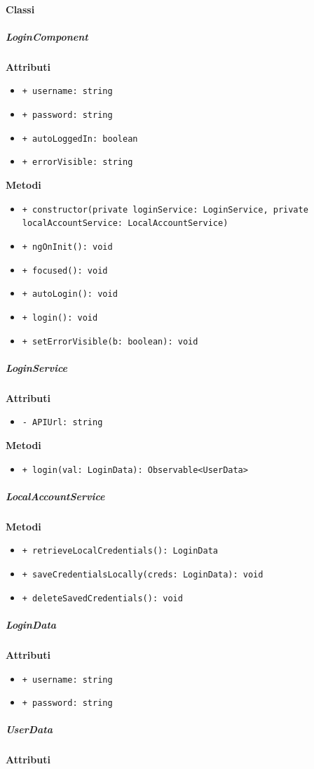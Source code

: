 \paragraph{Classi}

\subparagraph{LoginComponent}
\textbf{Attributi}
\begin{itemize}
	\item \texttt{+ username: string}
	\item \texttt{+ password: string}
	\item \texttt{+ autoLoggedIn: boolean}
	\item \texttt{+ errorVisible: string}
\end{itemize}
\textbf{Metodi}
\begin{itemize}
	\item \texttt{+ constructor(private loginService: LoginService, private localAccountService: LocalAccountService)}
	\item \texttt{+ ngOnInit(): void}
	\item \texttt{+ focused(): void}
	\item \texttt{+ autoLogin(): void}
	\item \texttt{+ login(): void}
	\item \texttt{+ setErrorVisible(b: boolean): void}
\end{itemize}
\subparagraph{LoginService}
\textbf{Attributi}
\begin{itemize}
	\item \texttt{- APIUrl: string}
\end{itemize}
\textbf{Metodi}
\begin{itemize}
	\item \texttt{+ login(val: LoginData): Observable<UserData>}
\end{itemize}
\subparagraph{LocalAccountService}
\textbf{Metodi}
\begin{itemize}
	\item \texttt{+ retrieveLocalCredentials(): LoginData}
	\item \texttt{+ saveCredentialsLocally(creds: LoginData): void}
	\item \texttt{+ deleteSavedCredentials(): void}
\end{itemize}
\subparagraph{LoginData}
\textbf{Attributi}
\begin{itemize}
	\item \texttt{+ username: string}
	\item \texttt{+ password: string}
\end{itemize}
\subparagraph{UserData}
\textbf{Attributi}
